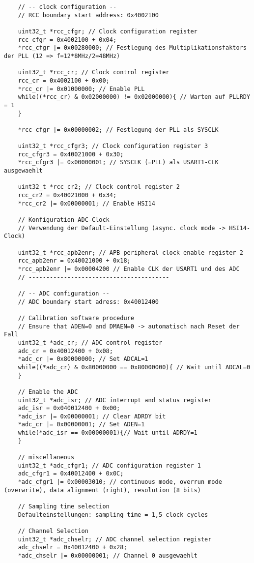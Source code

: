 \documentclass[11pt]{report}
\begin{document}
\begin{lstlisting}
	// -- clock configuration --
	// RCC boundary start address: 0x4002100

	uint32_t *rcc_cfgr; // Clock configuration register
	rcc_cfgr = 0x4002100 + 0x04;
	*rcc_cfgr |= 0x00280000; // Festlegung des Multiplikationsfaktors der PLL (12 => f=12*8MHz/2=48MHz)

	uint32_t *rcc_cr; // Clock control register
	rcc_cr = 0x4002100 + 0x00;
	*rcc_cr |= 0x01000000; // Enable PLL
	while((*rcc_cr) & 0x02000000) != 0x02000000){ // Warten auf PLLRDY = 1
	}

	*rcc_cfgr |= 0x00000002; // Festlegung der PLL als SYSCLK

	uint32_t *rcc_cfgr3; // Clock configuration register 3
	rcc_cfgr3 = 0x40021000 + 0x30;
	*rcc_cfgr3 |= 0x00000001; // SYSCLK (=PLL) als USART1-CLK ausgewaehlt

	uint32_t *rcc_cr2; // Clock control register 2
	rcc_cr2 = 0x40021000 + 0x34;
	*rcc_cr2 |= 0x00000001; // Enable HSI14
	
	// Konfiguration ADC-Clock
	// Verwendung der Default-Einstellung (async. clock mode -> HSI14-Clock)
	
	uint32_t *rcc_apb2enr; // APB peripheral clock enable register 2
	rcc_apb2enr = 0x40021000 + 0x18;
	*rcc_apb2enr |= 0x00004200 // Enable CLK der USART1 und des ADC
	// ----------------------------------------

	// -- ADC configuration --
	// ADC boundary start adress: 0x40012400

	// Calibration software procedure
	// Ensure that ADEN=0 and DMAEN=0 -> automatisch nach Reset der Fall
	uint32_t *adc_cr; // ADC control register
	adc_cr = 0x40012400 + 0x08;
	*adc_cr |= 0x80000000; // Set ADCAL=1
	while((*adc_cr) & 0x80000000 == 0x80000000){ // Wait until ADCAL=0
	}

	// Enable the ADC
	uint32_t *adc_isr; // ADC interrupt and status register
	adc_isr = 0x040012400 + 0x00;
	*adc_isr |= 0x00000001; // Clear ADRDY bit
	*adc_cr |= 0x00000001; // Set ADEN=1
	while(*adc_isr == 0x00000001){// Wait until ADRDY=1
	}

	// miscellaneous
	uint32_t *adc_cfgr1; // ADC configuration register 1
	adc_cfgr1 = 0x40012400 + 0x0C;
	*adc_cfgr1 |= 0x00003010; // continuous mode, overrun mode (overwrite), data alignment (right), resolution (8 bits)

	// Sampling time selection
	Defaulteinstellungen: sampling time = 1,5 clock cycles

	// Channel Selection
	uint32_t *adc_chselr; // ADC channel selection register
	adc_chselr = 0x40012400 + 0x28;
	*adc_chselr |= 0x00000001; // Channel 0 ausgewaehlt


\end{lstlisting}
\end{document}
